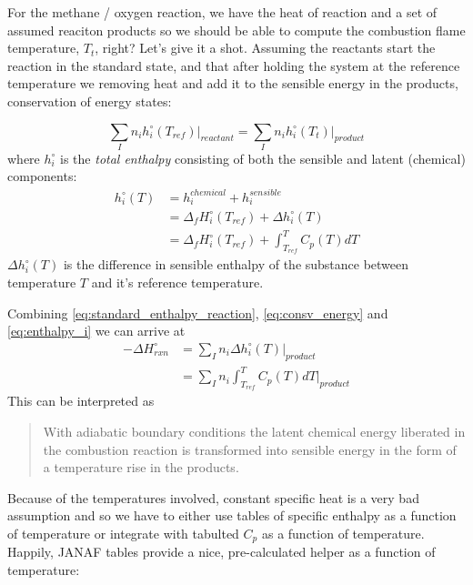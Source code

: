 \documentclass[twocolumn]{memoir} %
\begin{document}
For the methane / oxygen reaction, we have the heat of reaction and a set of assumed reaciton products so we should be able to compute the 
combustion flame temperature, $T_t$, right?  Let's give it a shot.  Assuming the reactants start the reaction in the
standard state, and that after holding the system at the reference temperature we removing heat and add it to 
the sensible energy in the products, conservation of energy states:

\begin{equation}
    \sum_I n_i h_{i}^\circ(T_{ref}) \vert_{reactant} = 
        \sum_I n_i h_{i}^\circ(T_{t}) \vert_{product}
     \label{eq:consv_energy}
\end{equation}
%
where $h_i^\circ$ is the \emph{total enthalpy} consisting of both the sensible and latent (chemical)
components:
\begin{equation}
    \begin{split}
        h_i^\circ(T) &= h_i^{chemical} + h_i^{sensible} \\
        &= \Delta_f H_{i}^\circ(T_{ref}) + \Delta h_{i}^\circ(T) \\
        &= \Delta_f H_{i}^\circ(T_{ref}) + \int_{T_{ref}}^T C_p(T)dT 
    \label{eq:enthalpy_i}
    \end{split}
\end{equation}
%
$\Delta h_{i}^\circ(T)$ is the difference in sensible enthalpy of the substance between temperature 
$T$ and it's reference temperature.

Combining \cref{eq:standard_enthalpy_reaction}, \cref{eq:consv_energy} and \cref{eq:enthalpy_i} we can
arrive at
\begin{equation}
    \begin{split}
        -\Delta H_{rxn}^\circ &= \sum_I n_i \Delta h_i^\circ(T) \vert_{product}\\
        &= \sum_I n_i \int_{T_{ref}}^T C_p(T)dT \vert_{product} 
    \end{split}
    \label{eq:adiabatic_T}
\end{equation}
%
This can be interpreted as

\begin{quote}
    With adiabatic boundary conditions the latent chemical energy liberated in the combustion reaction
    is transformed into sensible energy in the form of a temperature rise in the products. 
\end{quote}
%
Because of the temperatures involved, constant specific heat is a very bad assumption and so we have
to either use tables of specific enthalpy as a function of temperature or integrate with tabulted $C_p$
as a function of temperature.  Happily, JANAF tables provide a nice, pre-calculated helper as a function
of temperature:
\end{document}
